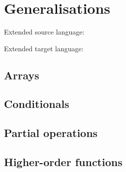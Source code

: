 \section{Generalisations}
\label{sec:generalisation}

Extended source language:





Extended target language:





\subsection{Arrays}

\subsection{Conditionals} 

\subsection{Partial operations} 

\subsection{Higher-order functions}
